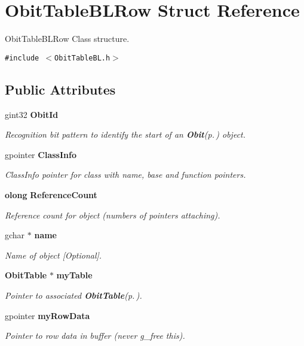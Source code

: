 \section{Obit\-Table\-BLRow Struct Reference}
\label{structObitTableBLRow}
Obit\-Table\-BLRow Class structure.  


{\tt \#include $<$Obit\-Table\-BL.h$>$}

\subsection*{Public Attributes}
\begin{CompactItemize}
\item 
gint32 {\bf Obit\-Id}
\begin{CompactList}\small\item\em Recognition bit pattern to identify the start of an {\bf Obit}{\rm (p.\,\pageref{structObit})} object. \item\end{CompactList}\item 
gpointer {\bf Class\-Info}
\begin{CompactList}\small\item\em Class\-Info pointer for class with name, base and function pointers. \item\end{CompactList}\item 
{\bf olong} {\bf Reference\-Count}
\begin{CompactList}\small\item\em Reference count for object (numbers of pointers attaching). \item\end{CompactList}\item 
gchar $\ast$ {\bf name}
\begin{CompactList}\small\item\em Name of object [Optional]. \item\end{CompactList}\item 
{\bf Obit\-Table} $\ast$ {\bf my\-Table}
\begin{CompactList}\small\item\em Pointer to associated {\bf Obit\-Table}{\rm (p.\,\pageref{structObitTable})}. \item\end{CompactList}\item 
gpointer {\bf my\-Row\-Data}
\begin{CompactList}\small\item\em Pointer to row data in buffer (never g\_\-free this). \item\end{CompactList}\item 

\end{CompactItemize}
